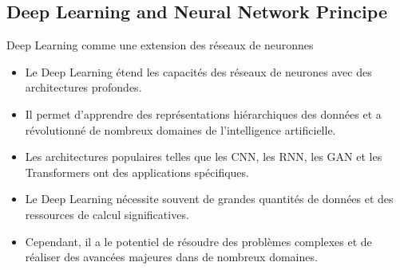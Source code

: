 \documentclass{beamer}
\begin{document}

\subsection{Deep Learning and Neural Network Principe}
\begin{frame}{Deep Learning comme une extension des réseaux de neuronnes}
	\begin{itemize}
		\item Le Deep Learning étend les capacités des réseaux de neurones avec des architectures profondes.
		\item Il permet d'apprendre des représentations hiérarchiques des données et a révolutionné de nombreux domaines de l'intelligence artificielle.
		\item Les architectures populaires telles que les CNN, les RNN, les GAN et les Transformers ont des applications spécifiques.
		\item Le Deep Learning nécessite souvent de grandes quantités de données et des ressources de calcul significatives.
		\item Cependant, il a le potentiel de résoudre des problèmes complexes et de réaliser des avancées majeures dans de nombreux domaines.
	\end{itemize}
	\end{frame}

\end{document}
